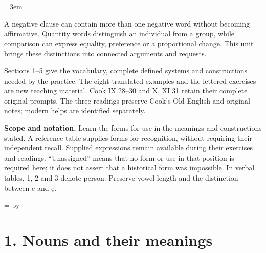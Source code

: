 \BookRecto
\begingroup
\renewcommand{\runningtitle}{Unit 15. Negation and quantity}
\emergencystretch=3em
\newcommand{\itempara}[2]{\par\addvspace{3pt}\noindent\hangindent=1.8em\hangafter=1\makebox[1.8em][l]{#1.}#2\par}
\newcommand{\reserve}[1]{\par\penalty-100\begingroup\dimen0=\pagegoal\advance\dimen0 by-\pagetotal\ifdim\dimen0<#1\newpage\fi\endgroup}

\raggedright
{}

A negative clause can contain more than one negative word without becoming affirmative. Quantity words distinguish an individual from a group, while comparison can express equality, preference or a proportional change. This unit brings these distinctions into connected arguments and requests.

Sections 1–5 give the vocabulary, complete defined systems and constructions needed by the practice. The eight translated examples and the lettered exercises are new teaching material. Cook IX.28–30 and X, XI.31 retain their complete original prompts. The three readings preserve Cook’s Old English and original notes; modern helps are identified separately.

\textbf{Scope and notation.} Learn the forms for use in the meanings and constructions stated. A reference table supplies forms for recognition, without requiring their independent recall. Supplied expressions remain available during their exercises and readings. “Unassigned” means that no form or use in that position is required here; it does not assert that a historical form was impossible. In verbal tables, 1, 2 and 3 denote person. Preserve vowel length and the distinction between e and ę.

\reserve{7\baselineskip}
\section*{1. Nouns and their meanings}

